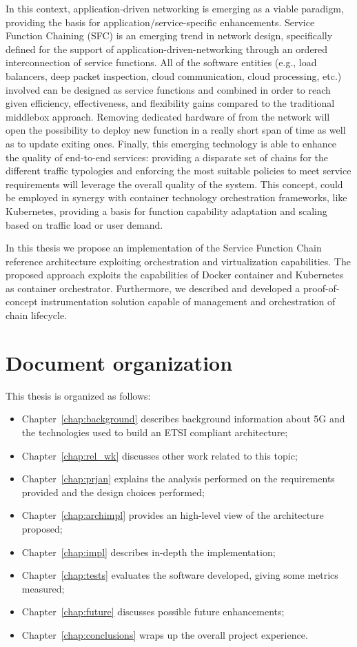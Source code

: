 In this context, application-driven networking is emerging as a viable
paradigm, providing the basis for application/service-specific enhancements. 
Service Function Chaining (SFC) is an emerging trend  in network design,
specifically defined for the support of application-driven-networking through an
ordered interconnection of service functions. All of the software entities
(e.g., load balancers, deep packet inspection, cloud communication, cloud
processing, etc.) involved can be designed as service functions and combined in
order to reach given efficiency, effectiveness, and flexibility gains compared
to the traditional middlebox approach. Removing dedicated hardware of from the
network will open the possibility to deploy new function in a really short span
of time as well as to update exiting ones. Finally, this emerging technology is
able to enhance the quality of end-to-end services: providing a disparate set of
chains for the different traffic typologies and enforcing the most suitable
policies to meet service requirements will leverage the overall quality of the
system. This concept, could be employed in synergy with container technology
orchestration frameworks, like Kubernetes, providing a basis for function
capability adaptation and scaling based on traffic load or
user demand.

In this thesis we propose an implementation of the Service Function Chain
reference architecture exploiting orchestration and virtualization capabilities.
The proposed approach exploits the capabilities of Docker container and
Kubernetes as container orchestrator. Furthermore, we described and developed a
proof-of-concept instrumentation solution capable of management and
orchestration of chain lifecycle.

\section*{Document organization}

This thesis is organized as follows:
\begin{itemize}
  \item Chapter~\ref{chap:background} describes background information about 5G 
and the technologies used to build an ETSI compliant architecture;
  \item Chapter~\ref{chap:rel_wk} discusses other work related to this topic;
  \item Chapter~\ref{chap:prjan} explains the analysis performed on the 
requirements provided and the design choices performed;
  \item Chapter~\ref{chap:archimpl} provides an high-level view of
  the architecture proposed;
  \item Chapter~\ref{chap:impl} describes in-depth the implementation;
  \item Chapter~\ref{chap:tests} evaluates the software developed, giving some
  metrics measured;
  \item Chapter~\ref{chap:future} discusses possible future enhancements;
  \item Chapter~\ref{chap:conclusions} wraps up the overall project experience.
\end{itemize}